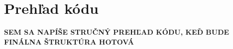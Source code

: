 \documentclass[report.tex]{subfiles}
\begin{document}
	
\section{Prehľad kódu}	

\textbf{SEM SA NAPÍŠE STRUČNÝ PREHĽAD KÓDU, KEĎ BUDE FINÁLNA ŠTRUKTÚRA HOTOVÁ}
\end{document}
